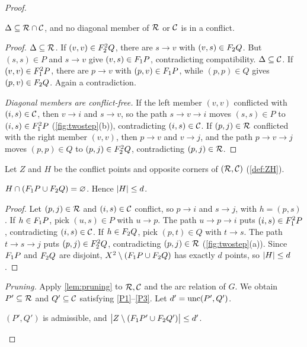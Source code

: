 \begin{proof}
\begin{claim}\label{cl:diag-free}
$\Delta\subseteq\mathcal R\cap\mathcal C$, and no diagonal member of $\mathcal R$ or $\mathcal C$ is in a conflict.
\end{claim}

\begin{proof}
\emph{$\Delta\subseteq\mathcal R$.} If $(v,v)\in F_2^2Q$, there are $s\to v$ with
$(v,s)\in F_2 Q$. But $(s,s)\in P$ and $s\to v$ give $(v,s)\in F_1 P$, contradicting
compatibility. \emph{$\Delta\subseteq\mathcal C$.} If $(v,v)\in F_1^2P$, there are $p\to v$ with
$(p,v)\in F_1 P$, while $(p,p)\in Q$ gives $(p,v)\in F_2 Q$. Again a contradiction.

\emph{Diagonal members are conflict-free.} If the left member $(v,v)$ conflicted
with $(i,s)\in\mathcal C$, then $v\to i$ and $s\to v$, so the path $s\to v\to i$ moves
$(s,s)\in P$ to $(i,s)\in F_1^2P$ (\cref{fig:twostep}(b)), contradicting
$(i,s)\in\mathcal C$. If $(p,j)\in\mathcal R$ conflicted with the right member $(v,v)$, then $p\to v$
and $v\to j$, and the path $p\to v\to j$ moves $(p,p)\in Q$ to $(p,j)\in F_2^2Q$,
contradicting $(p,j)\in\mathcal R$.
\end{proof}

Let $Z$ and $H$ be the conflict points and opposite corners of $(\mathcal R,\mathcal C)$
(\cref{def:ZH}).

\begin{claim}\label{cl:H-uncovered}
$H\cap(F_1 P\cup F_2 Q)=\varnothing$. Hence $\lvert H\rvert\le d$.
\end{claim}

\begin{proof}
Let $(p,j)\in\mathcal R$ and $(i,s)\in\mathcal C$ conflict, so $p\to i$ and $s\to j$, with
$h=(p,s)$. If $h\in F_1 P$, pick $(u,s)\in P$ with $u\to p$. The path $u\to p\to i$
puts $(i,s)\in F_1^2P$, contradicting $(i,s)\in\mathcal C$. If $h\in F_2 Q$, pick $(p,t)\in Q$
with $t\to s$. The path $t\to s\to j$ puts $(p,j)\in F_2^2Q$, contradicting
$(p,j)\in\mathcal R$ (\cref{fig:twostep}(a)). Since $F_1 P$ and $F_2 Q$ are disjoint,
$X^2\setminus(F_1 P\cup F_2 Q)$ has exactly $d$ points, so $\lvert H\rvert\le d$.
\end{proof}

\emph{Pruning.} Apply \cref{lem:pruning} to $\mathcal R,\mathcal C$ and the arc relation of $G$.
We obtain $P'\subseteq\mathcal R$ and $Q'\subseteq\mathcal C$ satisfying \ref{P1}--\ref{P3}. Let
$d'=\operatorname{unc}(P',Q')$.

\begin{claim}\label{cl:new-admissible}
$(P',Q')$ is admissible, and
$\bigl\lvert Z\setminus(F_1 P'\cup F_2 Q')\bigr\rvert\le d'$.
\end{claim}


\end{proof}
